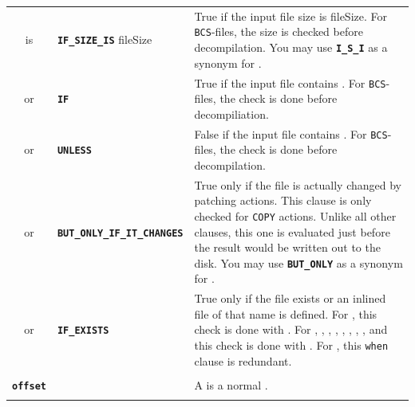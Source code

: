 \documentclass{article}
\def\ttref#1{\ahrefloc{#1}{\tt #1}}
\def\DEFINE#1{{\tt \bf #1}\label{#1}\index{#1}}
\def\t#1{{\tt #1}}
\begin{document}
\begin{tabular}{cp{10in}|p{10in}}
  is & \DEFINE{IF_SIZE_IS} fileSize & True if the input file size is
  fileSize. For \t{BCS}-files, the size is checked before
  decompilation. You may use \DEFINE{I_S_I} as a synonym for
  \ttref{IF_SIZE_IS}. \\

  or & \DEFINE{IF} \ttref{regexp} & True if the input file contains
  \ttref{regexp}. For \t{BCS}-files, the check is done before
  decompiliation. \\

  or & \DEFINE{UNLESS} \ttref{regexp} & False if the input file
  contains \ttref{regexp}. For \t{BCS}-files, the check is done before
  decompilation. \\

  or & \DEFINE{BUT_ONLY_IF_IT_CHANGES} & True only if the file is
  actually changed by patching actions. This \ttref{when} clause is
  only checked for \t{COPY} actions. Unlike all other \ttref{when}
  clauses, this one is evaluated just before the result would be
  written out to the disk.  You may use \DEFINE{BUT_ONLY} as a synonym
  for \ttref{BUT_ONLY_IF_IT_CHANGES}. \\

  or & \DEFINE{IF_EXISTS} & True only if the file exists or an inlined
  file of that name is defined. For \ttref{COPY}, this check is done
  with \ttref{FILE_EXISTS}. For \ttref{COPY_EXISTING},
  \ttref{COPY_EXISTING_REGEXP}, \ttref{COPY_RANDOM}, \ttref{APPEND (TP2)},
  \ttref{APPEND_COL}, \ttref{EXTEND_TOP (TP2)}, \ttref{EXTEND_BOTTOM (TP2)},
  \ttref{EXTEND_TOP_REGEXP}, and \ttref{EXTEND_BOTTOM_REGEXP} this
  check is done with \ttref{FILE_EXISTS_IN_GAME}. For
  \ttref{COPY_ALL_GAM_FILES}, this \t{when} clause is redundant. \\

\\

\DEFINE{offset} & & A \ttref{offset} is a normal \ttref{value}.
\\

\\



\end{tabular}
\end{document}
